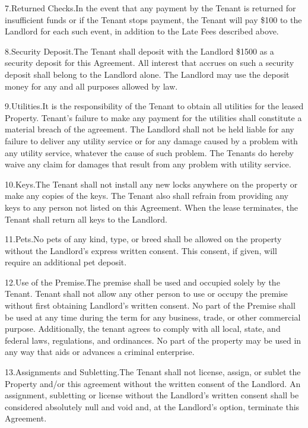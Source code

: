7.\quad Returned Checks.\quad In the event that any payment by the Tenant is returned
for insufficient funds or if the Tenant stops payment, the Tenant will pay
\$100 to the Landlord for each such event, in addition to the Late Fees
described above.  

8.\quad Security Deposit.\quad The Tenant shall deposit with the Landlord \$1500 as a
security deposit for this Agreement.  All interest that accrues on such a
security deposit shall belong to the Landlord alone. The Landlord may use the
deposit money for any and all purposes allowed by law.

9.\quad Utilities.\quad It is the responsibility of the Tenant to obtain all utilities
for the leased Property.  Tenant's failure to make any payment for the
utilities shall constitute a material breach of the agreement.  The Landlord
shall not be held liable for any failure to deliver any utility service or for
any damage caused by a problem with any utility service, whatever the cause of
such problem.  The Tenants do hereby waive any claim for damages that result
from any problem with utility service.

10.\quad Keys.\quad The Tenant shall not install any new locks anywhere on the property
or make any copies of the keys.  The Tenant also shall refrain from providing
any keys to any person not listed on this Agreement.  When the lease
terminates, the Tenant shall return all keys to the Landlord.

11.\quad Pets.\quad No pets of any kind, type, or breed shall be allowed on the property
without the Landlord's express written consent.  This consent, if given, will
require an additional pet deposit.

12.\quad Use of the Premise.\quad The premise shall be used and occupied solely by the
Tenant.  Tenant shall not allow any other person to use or occupy the premise
without first obtaining Landlord's written consent.  No part of the Premise
shall be used at any time during the term for any business, trade, or other
commercial purpose.  Additionally, the tenant agrees to comply with all local,
state, and federal laws, regulations, and ordinances.  No part of the property
may be used in any way that aids or advances a criminal enterprise.

13.\quad Assignments and Subletting.\quad The Tenant shall not license, assign, or sublet
the Property and/or this agreement without the written consent of the Landlord.
 An assignment, subletting or license without the Landlord's written consent
shall be considered absolutely null and void and, at the Landlord's option,
terminate this Agreement.

